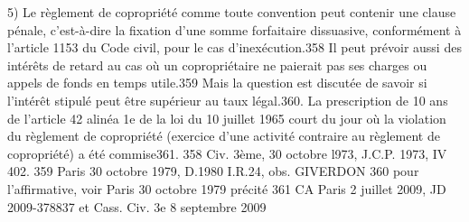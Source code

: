 		5) Le règlement de copropriété comme toute convention peut contenir une clause pénale, c'est-à-dire la fixation d'une somme forfaitaire dissuasive, conformément à l'article 1153 du Code civil, pour le cas d'inexécution.358
		Il peut prévoir aussi des intérêts de retard au cas où un copropriétaire ne paierait pas ses charges ou appels de fonds en temps utile.359 Mais la question est discutée de savoir si l'intérêt stipulé peut être supérieur au taux légal.360.
		La prescription de 10 ans de l’article 42 alinéa 1e de la loi du 10 juillet 1965 court du jour où la violation du règlement de copropriété (exercice d’une activité contraire au règlement de copropriété) a été commise361.
		358 Civ. 3ème, 30 octobre l973, J.C.P. 1973, IV 402.
		359 Paris 30 octobre 1979, D.1980 I.R.24, obs. GIVERDON
		360 pour l'affirmative, voir Paris 30 octobre 1979 précité
		361 CA Paris 2 juillet 2009, JD 2009-378837 et Cass. Civ. 3e 8 septembre 2009